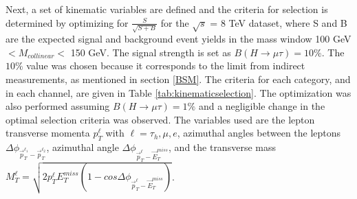 \documentclass[oneside, letterpaper, oldfontcommands]{memoir}
\begin{document}
\qquad Next, a set of kinematic variables are defined and the criteria for selection is determined by optimizing for $\frac{S}{\sqrt{S+B}}$ for the $\sqrt{s}$ = 8 TeV dataset, where S and B are the expected signal and background event yields in the mass window 100 GeV $< M_{collinear} <$ 150 GeV. The signal strength is set as $B(H\rightarrow\mu\tau) = 10\%$. The $10\%$ value was chosen because it corresponds to the limit from indirect measurements, as mentioned in section \ref{BSM}. The criteria for each category, and in each channel, are given in Table \ref{tab:kinematicselection}. The optimization was also performed assuming $B(H\rightarrow\mu\tau) = 1\%$ and a negligible change in the optimal selection criteria was observed. The variables used are the lepton transverse momenta $p_{T}^{\ell}$ with $\ell = \tau_{h},\mu,e$, azimuthal angles between the leptons 
$\Delta\phi_{\vec{p}_{T}^{\ell_{1}}-\vec{p}_{T}^{\ell_{2}}}$, azimuthal angle 
$\Delta\phi_{\vec{p}_{T}^{\ell}-\vec{E}_{T}^{miss}}$, and the transverse mass 
$M_{T}^{\ell} = \sqrt{2 p_{T}^{\ell}E_{T}^{miss}(1-cos \Delta\phi_{\vec{p}_{T}^{\ell}-\vec{E}_{T}^{miss}})}$. 
\end{document}
